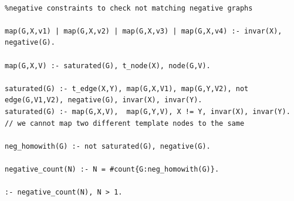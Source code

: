 \begin{lstlisting}[caption=ASP negative matching, style=model]
%Saturated Representation

%negative constraints to check not matching negative graphs

map(G,X,v1) | map(G,X,v2) | map(G,X,v3) | map(G,X,v4) :- invar(X), negative(G).

map(G,X,V) :- saturated(G), t_node(X), node(G,V).

saturated(G) :- t_edge(X,Y), map(G,X,V1), map(G,Y,V2), not edge(G,V1,V2), negative(G), invar(X), invar(Y).
saturated(G) :- map(G,X,V),  map(G,Y,V), X != Y, invar(X), invar(Y). // we cannot map two different template nodes to the same 

neg_homowith(G) :- not saturated(G), negative(G).

negative_count(N) :- N = #count{G:neg_homowith(G)}.

:- negative_count(N), N > 1.

\end{lstlisting}

%
%
%
%
%
%
%
%
%
%
%
%
%
%

